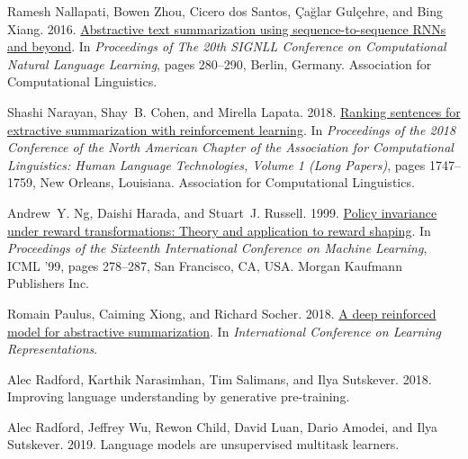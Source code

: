 \documentclass[11pt,a4paper]{article}
\begin{document}
\begin{thebibliography}{46}
Ramesh Nallapati, Bowen Zhou, Cicero dos Santos, {\c{C}}a{\u{g}}lar
  Gul{\c{c}}ehre, and Bing Xiang. 2016.
\newblock \href {https://doi.org/10.18653/v1/K16-1028} {Abstractive text
  summarization using sequence-to-sequence {RNN}s and beyond}.
\newblock In \emph{Proceedings of The 20th {SIGNLL} Conference on Computational
  Natural Language Learning}, pages 280--290, Berlin, Germany. Association for
  Computational Linguistics.

Shashi Narayan, Shay~B. Cohen, and Mirella Lapata. 2018.
\newblock \href {https://doi.org/10.18653/v1/N18-1158} {Ranking sentences for
  extractive summarization with reinforcement learning}.
\newblock In \emph{Proceedings of the 2018 Conference of the North {A}merican
  Chapter of the Association for Computational Linguistics: Human Language
  Technologies, Volume 1 (Long Papers)}, pages 1747--1759, New Orleans,
  Louisiana. Association for Computational Linguistics.

Andrew~Y. Ng, Daishi Harada, and Stuart~J. Russell. 1999.
\newblock \href {http://dl.acm.org/citation.cfm?id=645528.657613} {Policy
  invariance under reward transformations: Theory and application to reward
  shaping}.
\newblock In \emph{Proceedings of the Sixteenth International Conference on
  Machine Learning}, ICML '99, pages 278--287, San Francisco, CA, USA. Morgan
  Kaufmann Publishers Inc.

Romain Paulus, Caiming Xiong, and Richard Socher. 2018.
\newblock \href {https://openreview.net/forum?id=HkAClQgA-} {A deep reinforced
  model for abstractive summarization}.
\newblock In \emph{International Conference on Learning Representations}.

Alec Radford, Karthik Narasimhan, Tim Salimans, and Ilya Sutskever. 2018.
\newblock Improving language understanding by generative pre-training.

Alec Radford, Jeffrey Wu, Rewon Child, David Luan, Dario Amodei, and Ilya
  Sutskever. 2019.
\newblock Language models are unsupervised multitask learners.


\end{thebibliography}
\end{document}
